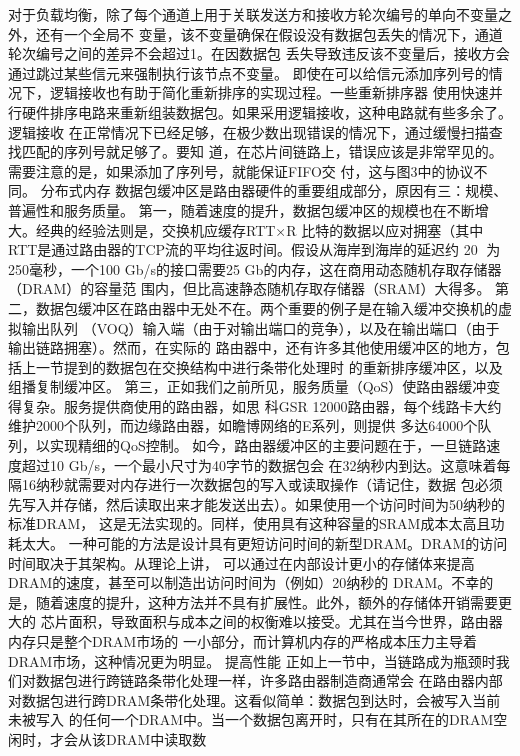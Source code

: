 对于负载均衡，除了每个通道上用于关联发送方和接收方轮次编号的单向不变量之外，还有一个全局不
变量，该不变量确保在假设没有数据包丢失的情况下，通道轮次编号之间的差异不会超过1。在因数据包
丢失导致违反该不变量后，接收方会通过跳过某些信元来强制执行该节点不变量。
即使在可以给信元添加序列号的情况下，逻辑接收也有助于简化重新排序的实现过程。一些重新排序器
使用快速并行硬件排序电路来重新组装数据包。如果采用逻辑接收，这种电路就有些多余了。逻辑接收
在正常情况下已经足够，在极少数出现错误的情况下，通过缓慢扫描查找匹配的序列号就足够了。要知
道，在芯片间链路上，错误应该是非常罕见的。需要注意的是，如果添加了序列号，就能保证FIFO交
付，这与图3中的协议不同。
分布式内存
数据包缓冲区是路由器硬件的重要组成部分，原因有三：规模、普遍性和服务质量。
第一，随着速度的提升，数据包缓冲区的规模也在不断增大。经典的经验法则是，交换机应缓存RTT×R
比特的数据以应对拥塞（其中RTT是通过路由器的TCP流的平均往返时间。假设从海岸到海岸的延迟约
                                              20
为250毫秒，一个100 Gb/s的接口需要25 Gb的内存，这在商用动态随机存取存储器（DRAM）的容量范
围内，但比高速静态随机存取存储器（SRAM）大得多。
第二，数据包缓冲区在路由器中无处不在。两个重要的例子是在输入缓冲交换机的虚拟输出队列
（VOQ）输入端（由于对输出端口的竞争），以及在输出端口（由于输出链路拥塞）。然而，在实际的
路由器中，还有许多其他使用缓冲区的地方，包括上一节提到的数据包在交换结构中进行条带化处理时
的重新排序缓冲区，以及组播复制缓冲区。
第三，正如我们之前所见，服务质量（QoS）使路由器缓冲变得复杂。服务提供商使用的路由器，如思
科GSR 12000路由器，每个线路卡大约维护2000个队列，而边缘路由器，如瞻博网络的E系列，则提供
多达64000个队列，以实现精细的QoS控制。
如今，路由器缓冲区的主要问题在于，一旦链路速度超过10 Gb/s，一个最小尺寸为40字节的数据包会
在32纳秒内到达。这意味着每隔16纳秒就需要对内存进行一次数据包的写入或读取操作（请记住，数据
包必须先写入并存储，然后读取出来才能发送出去）。如果使用一个访问时间为50纳秒的标准DRAM，
这是无法实现的。同样，使用具有这种容量的SRAM成本太高且功耗太大。
一种可能的方法是设计具有更短访问时间的新型DRAM。DRAM的访问时间取决于其架构。从理论上讲，
可以通过在内部设计更小的存储体来提高DRAM的速度，甚至可以制造出访问时间为（例如）20纳秒的
DRAM。不幸的是，随着速度的提升，这种方法并不具有扩展性。此外，额外的存储体开销需要更大的
芯片面积，导致面积与成本之间的权衡难以接受。尤其在当今世界，路由器内存只是整个DRAM市场的
一小部分，而计算机内存的严格成本压力主导着DRAM市场，这种情况更为明显。
提高性能
正如上一节中，当链路成为瓶颈时我们对数据包进行跨链路条带化处理一样，许多路由器制造商通常会
在路由器内部对数据包进行跨DRAM条带化处理。这看似简单：数据包到达时，会被写入当前未被写入
的任何一个DRAM中。当一个数据包离开时，只有在其所在的DRAM空闲时，才会从该DRAM中读取数
